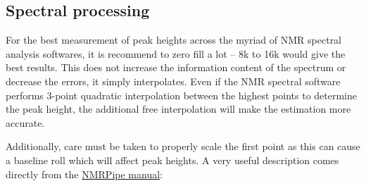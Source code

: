 
\subsection{Spectral processing}

For the best measurement of peak heights across the myriad of NMR spectral analysis softwares, it is recommend to zero fill a lot -- 8k to 16k would give the best results.  This does not increase the information content of the spectrum or decrease the errors, it simply interpolates.  Even if the NMR spectral software performs 3-point quadratic interpolation between the highest points to determine the peak height, the additional free interpolation will make the estimation more accurate.

Additionally, care must be taken to properly scale the first point as this can cause a baseline roll which will affect peak heights.  A very useful description comes directly from the \href{http://spin.niddk.nih.gov/NMRPipe/doc1/}{NMRPipe manual}:

